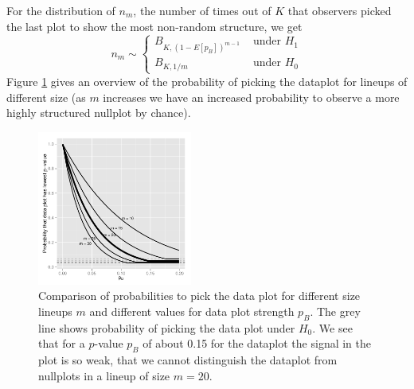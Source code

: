 \documentclass[11pt]{article}
\begin{document}
For the distribution of $n_m$, the number of times out of $K$ that observers picked the last plot to show the most non-random structure, we get
\[
n_m\sim \left \{ 
\begin{array}{cl}
B_{K, (1-E[p_B])^{m-1}} & \text { under } H_1\\
B_{K, 1/m} & \text { under } H_0
\end{array}
\right .
\]
Figure \ref{power} gives an overview of the probability of picking the dataplot for lineups of different size (as $m$ increases we have an increased probability to observe a more highly structured nullplot by chance).

\begin{figure}[htbp] %
   \centering
   \includegraphics[width=2in]{images/powerplot.pdf} 
   \caption{Comparison of probabilities to pick the data plot for different size lineups $m$ and different values for data plot strength $p_B$. The grey line shows probability of picking the data plot under $H_0$. We see that for a $p$-value $p_B$ of about 0.15 for the dataplot the signal in the plot is so weak, that we cannot distinguish the dataplot from nullplots in a lineup of size $m=20$. }
   \label{power}
\end{figure}

\end{document}
